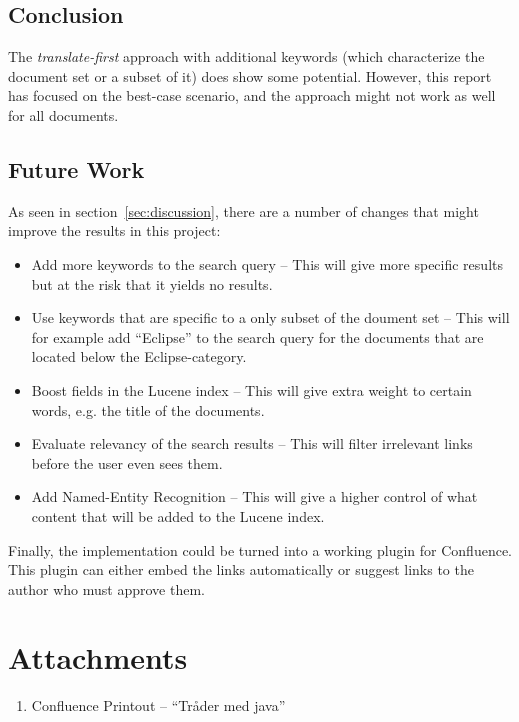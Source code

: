 \documentclass[a4paper]{book}
\begin{document}
\section{Conclusion}
\label{sec:conclusion}

The \textit{translate-first} approach with additional keywords (which characterize the document set or a subset of it) does show some potential. However, this report has focused on the best-case scenario, and the approach might not work as well for all documents.

\section{Future Work}
\label{sec:futureWork}

As seen in section~\ref{sec:discussion}, there are a number of changes that might improve the results in this project:
\begin{itemize}
\item Add more keywords to the search query -- This will give more specific results but at the risk that it yields no results.
\item Use keywords that are specific to a only subset of the doument set -- This will for example add ``Eclipse'' to the search query for the documents that are located below the Eclipse-category.
\item Boost fields in the Lucene index -- This will give extra weight to certain words, e.g. the title of the documents.
\item Evaluate relevancy of the search results -- This will filter irrelevant links before the user even sees them.
\item Add Named-Entity Recognition -- This will give a higher control of what content that will be added to the Lucene index.
\end{itemize}

Finally, the implementation could be turned into a working plugin for Confluence. This plugin can either embed the links automatically or suggest links to the author who must approve them.

\backmatter



\chapter{Attachments}
\label{cha:attachments}

\begin{enumerate}
\item\label{att:confluence-tr-der-med-java} Confluence Printout -- ``Tråder med java''
\end{enumerate}

\cleardoublepage
\end{document}
